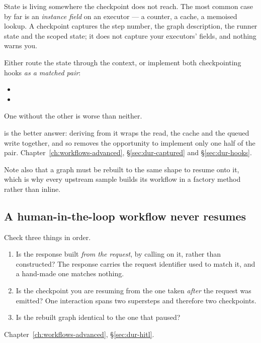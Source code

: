 State is living somewhere the checkpoint does not reach. The most common case by
far is an \emph{instance field} on an executor --- a counter, a cache, a memoised
lookup. A checkpoint captures the step number, the graph description, the runner
state and the scoped state; it does not capture your executors' fields, and
nothing warns you.

Either route the state through the context, or implement both checkpointing
hooks \emph{as a matched pair}:

\begin{itemize}[leftmargin=1.4em,nosep]
\item {}
\item {}
\end{itemize}

\medskip
\noindent
One without the other is worse than neither.

 is the better answer: deriving from it wraps the read, the
cache and the queued write together, and so removes the opportunity to implement
only one half of the pair. Chapter~\ref{ch:workflows-advanced},
\S\ref{sec:dur-captured} and \S\ref{sec:dur-hooks}.

Note also that a graph must be rebuilt to the same shape to resume onto it, which
is why every upstream sample builds its workflow in a factory method rather than
inline.

\subsection{A human-in-the-loop workflow never resumes}

Check three things in order.

\begin{enumerate}[leftmargin=1.4em,nosep]
\item Is the response built \emph{from the request}, by calling
       on it, rather than constructed? The response carries
      the request identifier used to match it, and a hand-made one matches
      nothing.
\item Is the checkpoint you are resuming from the one taken \emph{after} the
      request was emitted? One interaction spans two supersteps and therefore
      two checkpoints.
\item Is the rebuilt graph identical to the one that paused?
\end{enumerate}

Chapter~\ref{ch:workflows-advanced}, \S\ref{sec:dur-hitl}.

